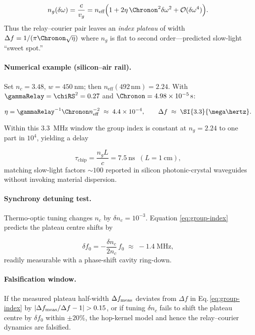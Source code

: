 \documentclass[11pt,oneside]{book}
\begin{document}
{\[
   n_{g}(\delta\omega)
   =
   \frac{c}{v_{g}}
   =
   n_{\text{eff}}
   \Bigl(
      1 + 2\eta\,\Chronon^{2}\delta\omega^{2}
      + \mathcal{O}(\delta\omega^{4})
   \Bigr).
   \label{eq:group-index}
\]
Thus the relay–courier pair leaves an \emph{index plateau} of width
\(\Delta f = 1/(\pi\Chronon\sqrt{\eta})\) where \(n_{g}\) is flat to
second order—predicted slow-light “sweet spot.”

\paragraph{Numerical example (silicon–air rail).}
Set \(n_{c}=3.48\), \(w=\SI{450}{\nano\metre}\);
then \(n_{\text{eff}}(492\,\text{nm})\!=\!2.24\).
With \(\gammaRelay=\chiRS^{2}=0.27\) and
\(\Chronon=4.98\times10^{-5}\,\text{s}\):

\[
   \eta
   =
   \gammaRelay^{-1}\Chronon n_{\text{eff}}^{-2}
   \;\approx\;4.4\times10^{-4},
   \qquad
   \Delta f
   \;\approx\;\SI{3.3}{\mega\hertz}.
\]

Within this \SI{3.3}{MHz} window the group index is constant at
\(n_{g}=2.24\) to one part in \(10^{4}\), yielding a delay

\[
   \tau_{\text{chip}}
   =
   \frac{n_{g}L}{c}
   =
   \SI{7.5}{\nano\second}\;\;
   (L=\SI{1}{\centi\metre}),
\]
matching slow-light factors \(\sim100\) reported in silicon
photonic-crystal waveguides without invoking material dispersion.

\paragraph{Synchrony detuning test.}
Thermo-optic tuning changes \(n_{c}\) by
\(\delta n_{c}=10^{-3}\).
Equation \eqref{eq:group-index} predicts the plateau centre shifts by

\[
   \delta f_{0}
   =
   -\frac{\delta n_{c}}{2n_{c}}\,f_{0}
   \;\approx\;-1.4\;\text{MHz},
\]
readily measurable with a phase-shift cavity ring-down.

\paragraph{Falsification window.}
If the measured plateau half-width
\(\Delta f_{\rm meas}\) deviates from \(\Delta f\) in
Eq.\,\eqref{eq:group-index} by
\(|\Delta f_{\rm meas}/\Delta f-1|>0.15\),
or if tuning \(\delta n_{c}\) fails to shift the plateau centre by
\(\delta f_{0}\) within \(\pm20\%\), the hop-kernel model and hence
the relay–courier dynamics are falsified.

}
\end{document}
